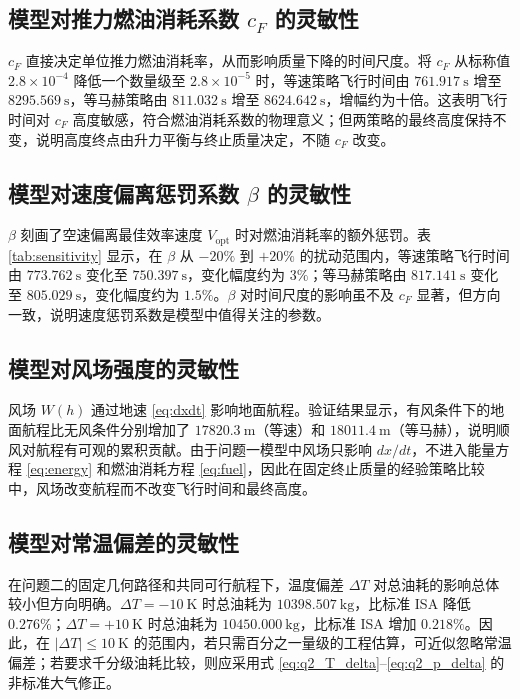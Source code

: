 \documentclass[withoutpreface,bwprint]{cumcmthesis}
\begin{document}
\subsection{\texorpdfstring{模型对推力燃油消耗系数 $c_F$ 的灵敏性}{模型对推力燃油消耗系数 cF 的灵敏性}}

$c_F$ 直接决定单位推力燃油消耗率，从而影响质量下降的时间尺度。将 $c_F$ 从标称值 $2.8\times 10^{-4}$ 降低一个数量级至 $2.8\times 10^{-5}$ 时，等速策略飞行时间由 $761.917\ \mathrm{s}$ 增至 $8295.569\ \mathrm{s}$，等马赫策略由 $811.032\ \mathrm{s}$ 增至 $8624.642\ \mathrm{s}$，增幅约为十倍。这表明飞行时间对 $c_F$ 高度敏感，符合燃油消耗系数的物理意义；但两策略的最终高度保持不变，说明高度终点由升力平衡与终止质量决定，不随 $c_F$ 改变。

\subsection{\texorpdfstring{模型对速度偏离惩罚系数 $\beta$ 的灵敏性}{模型对速度偏离惩罚系数 beta 的灵敏性}}

$\beta$ 刻画了空速偏离最佳效率速度 $V_{\mathrm{opt}}$ 时对燃油消耗率的额外惩罚。表 \ref{tab:sensitivity} 显示，在 $\beta$ 从 $-20\%$ 到 $+20\%$ 的扰动范围内，等速策略飞行时间由 $773.762\ \mathrm{s}$ 变化至 $750.397\ \mathrm{s}$，变化幅度约为 $3\%$；等马赫策略由 $817.141\ \mathrm{s}$ 变化至 $805.029\ \mathrm{s}$，变化幅度约为 $1.5\%$。$\beta$ 对时间尺度的影响虽不及 $c_F$ 显著，但方向一致，说明速度惩罚系数是模型中值得关注的参数。

\subsection{模型对风场强度的灵敏性}

风场 $W(h)$ 通过地速 \eqref{eq:dxdt} 影响地面航程。验证结果显示，有风条件下的地面航程比无风条件分别增加了 $17820.3\ \mathrm{m}$（等速）和 $18011.4\ \mathrm{m}$（等马赫），说明顺风对航程有可观的累积贡献。由于问题一模型中风场只影响 $dx/dt$，不进入能量方程 \eqref{eq:energy} 和燃油消耗方程 \eqref{eq:fuel}，因此在固定终止质量的经验策略比较中，风场改变航程而不改变飞行时间和最终高度。

\subsection{模型对常温偏差的灵敏性}

在问题二的固定几何路径和共同可行航程下，温度偏差 $\Delta T$ 对总油耗的影响总体较小但方向明确。$\Delta T=-10\ \mathrm{K}$ 时总油耗为 $10398.507\ \mathrm{kg}$，比标准 ISA 降低 $0.276\%$；$\Delta T=+10\ \mathrm{K}$ 时总油耗为 $10450.000\ \mathrm{kg}$，比标准 ISA 增加 $0.218\%$。因此，在 $|\Delta T|\leq10\ \mathrm{K}$ 的范围内，若只需百分之一量级的工程估算，可近似忽略常温偏差；若要求千分级油耗比较，则应采用式 \eqref{eq:q2_T_delta}--\eqref{eq:q2_p_delta} 的非标准大气修正。
\end{document}
